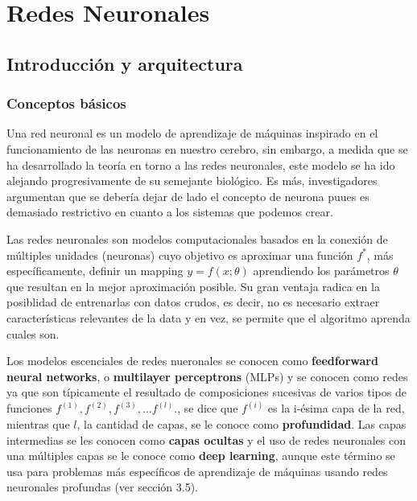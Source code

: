 
\newpage
\section{Redes Neuronales}

\subsection{Introducción y arquitectura}

\subsubsection{Conceptos básicos}

Una red neuronal es un modelo de aprendizaje de máquinas inspirado en el funcionamiento de las neuronas en nuestro cerebro, sin embargo, a medida que se ha desarrollado la teoría en torno a las redes neuronales, este modelo se ha ido alejando progresivamente de su semejante biológico. Es más, investigadores argumentan que se debería dejar de lado el concepto de neurona puues es demasiado restrictivo en cuanto a los sistemas que podemos crear. 

Las redes neuronales son modelos computacionales basados en la conexión de múltiples unidades (neuronas) cuyo objetivo es aproximar una función $f^{*}$, más específicamente, definir un mapping $y = f(x;\theta)$ aprendiendo los parámetros $\theta$ que resultan en la mejor aproximación posible. Su gran ventaja radica en la posiblidad de entrenarlas con datos crudos, es decir, no es necesario extraer características relevantes de la data y en vez, se permite que el algoritmo aprenda cuales son. 

Los modelos escenciales de redes nueronales se conocen como \textbf{feedforward neural networks}, o \textbf{multilayer perceptrons} (MLPs) y se conocen como redes ya que son típicamente el resultado de composiciones sucesivas de varios tipos de funciones $f^{(1)},f^{(2)},f^{(3)}, \dots f^{(l)} .$, se dice que $f^{(i)}$ es la i-ésima capa de la red, mientras que $l$, la cantidad de capas, se le conoce como \textbf{profundidad}. Las capas intermedias se les conocen como \textbf{capas ocultas} y el uso de redes neuronales con una múltiples capas se le conoce como \textbf{deep learning}, aunque este término se usa para problemas más específicos de aprendizaje de máquinas usando redes neuronales profundas (ver sección 3.5).

